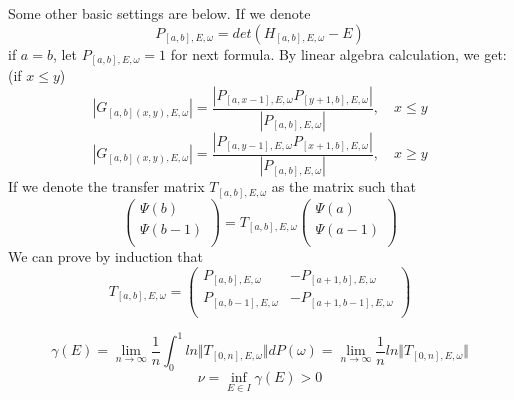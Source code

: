 Some other basic settings are below. If we denote
\[
  P_{[a,b],E,\omega}=det(H_{[a,b],E,\omega}-E)
\]
if $a=b$, let $  P_{[a,b],E,\omega}=1$ for next formula.
By linear algebra calculation, we get:(if $x\leq y$)
\[
  \left\vert G_{[a,b](x,y),E,\omega}\right\vert=\frac{\left\vert P_{[a,x-1],E,\omega}P_{[y+1,b],E,\omega}\right\vert}{\left\vert P_{[a,b],E,\omega}\right\vert},\quad x\leq y
\]
\[
  \left\vert G_{[a,b](x,y),E,\omega}\right\vert=\frac{\left\vert P_{[a,y-1],E,\omega}P_{[x+1,b],E,\omega}\right\vert}{\left\vert P_{[a,b],E,\omega}\right\vert},\quad x\geq y
\]
If we denote the transfer matrix $T_{[a,b],E,\omega}$ as the matrix such that
\[
\left(
\begin{array}{c}
  \Psi(b)\\
  \Psi(b-1)\\
\end{array}
\right)
=T_{[a,b],E,\omega} \left(
\begin{array}{c}
  \Psi(a)\\
  \Psi(a-1)\\
\end{array}
\right)
\]
We can prove by induction that
\[
T_{[a,b],E,\omega}=\left(
  \begin{array}{cc}
    P_{[a,b],E,\omega} & -P_{[a+1,b],E,\omega}\\
    P_{[a,b-1],E,\omega} & -P_{[a+1,b-1],E,\omega}\\
  \end{array}
  \right)
\]
\begin{definition}
  \[
    \gamma(E)=\lim_{n\to\infty}\frac{1}{n}\int_0^1 ln\Vert T_{[0,n],E,\omega}\Vert dP(\omega)=\lim_{n\rightarrow\infty}\frac{1}{n} ln\Vert T_{[0,n],E,\omega}\Vert
  \]
  \[\nu=\inf\limits_{E\in I}\gamma(E)>0\]
\end{definition}


